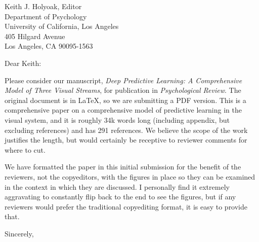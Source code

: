 \documentclass[11pt]{letter}
\begin{document}
\begin{letter}
{ Keith J. Holyoak, Editor\\ 
Department of Psychology \\
University of California, Los Angeles \\
405 Hilgard Avenue \\
Los Angeles, CA 90095-1563 \\}

\opening{Dear Keith:}

Please consider our manuscript, {\em Deep Predictive Learning: A Comprehensive Model of Three Visual Streams}, for publication in {\em Psychological Review}.  The original document is in LaTeX, so we are submitting a PDF version.  This is a comprehensive paper on a comprehensive model of predictive learning in the visual system, and it is roughly 34k words long (including appendix, but excluding references) and has 291 references.  We believe the scope of the work justifies the length, but would certainly be receptive to reviewer comments for where to cut.

We have formatted the paper in this initial submission for the benefit of the reviewers, not the copyeditors, with the figures in place so they can be examined in the context in which they are discussed.  I personally find it extremely aggravating to constantly flip back to the end to see the figures, but if any reviewers would prefer the traditional copyediting format, it is easy to provide that.

\closing{Sincerely,}


\end{letter}
\end{document}
